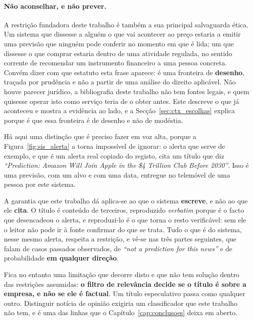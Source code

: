 \paragraph{Não aconselhar, e não prever.} A restrição fundadora deste trabalho é também a sua
principal salvaguarda ética. Um sistema que dissesse a alguém o que vai acontecer ao preço estaria
a emitir uma previsão que ninguém pode conferir no momento em que é lida; um que dissesse o que
comprar estaria dentro de uma atividade regulada, no sentido corrente de recomendar um
instrumento financeiro a uma pessoa concreta. Convém dizer com que estatuto esta frase aparece:
é uma fronteira de \textbf{desenho}, traçada por prudência e não a partir de uma análise do direito
aplicável. Não houve parecer jurídico, a bibliografia deste trabalho não tem fontes legais, e
quem quisesse operar isto como serviço teria de o obter antes. Este descreve o que já aconteceu e mostra a
evidência ao lado, e a Secção~\ref{sec:ctx_escolhas} explica porque é que essa fronteira é de
desenho e não de modéstia.

Há aqui uma distinção que é preciso fazer em voz alta, porque a Figura~\ref{fig:sis_alerta} a
torna impossível de ignorar: o alerta que serve de exemplo, e que é um alerta real copiado do
registo, cita um título que diz \emph{``Prediction: Amazon Will Join Apple in the \$4 Trillion Club
Before 2030''}. Isso é uma previsão, com um alvo e com uma data, entregue no telemóvel de uma
pessoa por este sistema.

A garantia que este trabalho dá aplica-se ao que o sistema \textbf{escreve}, e não ao que ele
\textbf{cita}. O título é conteúdo de terceiros, reproduzido \emph{verbatim} porque é o facto que
desencadeou o alerta, e reproduzi-lo é o que torna o resto verificável: sem ele o leitor não pode
ir à fonte confirmar do que se trata. Tudo o que é do sistema, nesse mesmo alerta, respeita a
restrição, e vê-se nas três partes seguintes, que falam de casos passados observados, de
\emph{``not a prediction for this news''} e de probabilidade \textbf{em qualquer direção}.

Fica no entanto uma limitação que decorre disto e que não tem solução dentro das restrições
assumidas: \textbf{o filtro de relevância decide se o título é sobre a empresa, e não se ele é
factual}. Um título especulativo passa como qualquer outro. Distinguir notícia de opinião exigiria
um classificador que este trabalho não tem, e é uma das linhas que o
Capítulo~\ref{cap:conclusoes} deixa em aberto.

